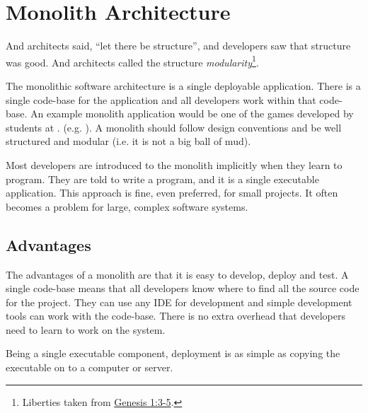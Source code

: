 \section{Monolith Architecture}

\noindent
And architects said, ``let there be structure'', and developers saw that structure was good.
And architects called the structure \emph{modularity}\footnote{Liberties taken from
\href{https://www.biblegateway.com/passage/?search=gen+1\&version=ESV}{Genesis 1:3-5}.}.

The monolithic software architecture is a single deployable application.
There is a single code-base for the application and all developers work within that code-base.
An example monolith application would be one of the games developed by 
students at .
(e.g. ).
A monolith should follow design conventions and be well structured and modular
(i.e. it is not a big ball of mud).

Most developers are introduced to the monolith implicitly when they learn to program.
They are told to write a program, and it is a single executable application.
This approach is fine, even preferred, for small projects.
It often becomes a problem for large, complex software systems.

\subsection{Advantages}

The advantages of a monolith are that it is easy to develop, deploy and test.
A single code-base means that all developers know where to find all the source code for the project.
They can use any IDE for development and simple development tools can work with the code-base.
There is no extra overhead that developers need to learn to work on the system.

Being a single executable component, deployment is as simple as copying the executable on to a computer or server.

